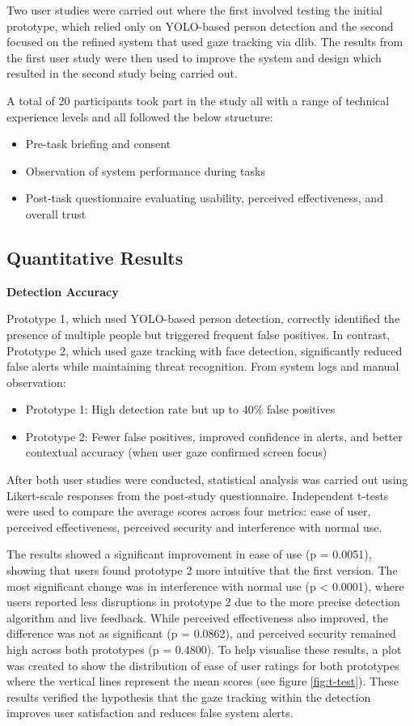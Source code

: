 \documentclass[12pt]{article}
\theoremstyle{plain}
\theoremstyle{definition}
\begin{document}
Two user studies were carried out where the first involved testing the initial prototype, which relied only on YOLO-based person detection and the second focused on the refined system that used gaze tracking via dlib. The results from the first user study were then used to improve the system and design which resulted in the second study being carried out.

A total of 20 participants took part in the study all with a range of technical experience levels and all followed the below structure:

\begin{itemize}
    \item Pre-task briefing and consent
    \item Observation of system performance during tasks
    \item Post-task questionnaire evaluating usability, perceived effectiveness, and overall trust
\end{itemize}

\subsection{Quantitative Results}

\textbf{Detection Accuracy}

Prototype 1, which used YOLO-based person detection, correctly identified the presence of multiple people but triggered frequent false positives. In contrast, Prototype 2, which used gaze tracking with face detection, significantly reduced false alerts while maintaining threat recognition.
From system logs and manual observation:
\begin{itemize}
    \item Prototype 1: High detection rate but up to 40\% false positives
    \item Prototype 2: Fewer false positives, improved confidence in alerts, and better contextual accuracy (when user gaze confirmed screen focus)
\end{itemize}

After both user studies were conducted, statistical analysis was carried out using Likert-scale responses from the post-study questionnaire. Independent t-tests were used to compare the average scores across four metrics: ease of user, perceived effectiveness, perceived security and interference with normal use.

The results showed a significant improvement in ease of use (p = 0.0051), showing that users found prototype 2 more intuitive that the first version. The most significant change was in interference with normal use (p < 0.0001), where users reported less disruptions in prototype 2 due to the more precise detection algorithm and live feedback. While perceived effectiveness also improved, the difference was not as significant (p = 0.0862), and perceived security remained high across both prototypes (p = 0.4800). To help visualise these results, a plot was created to show the distribution of ease of user ratings for both prototypes where the vertical lines represent the mean scores (see figure \ref{fig:t-test}). These results verified the hypothesis that the gaze tracking within the detection improves user satisfaction and reduces false system alerts.
\end{document}
